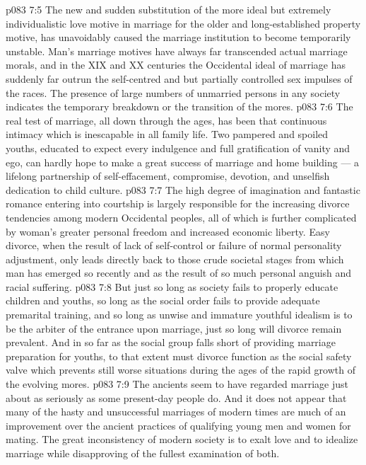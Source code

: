 \vs p083 7:5 The new and sudden substitution of the more ideal but extremely individualistic love motive in marriage for the older and long\hyp{}established property motive, has unavoidably caused the marriage institution to become temporarily unstable. Man’s marriage motives have always far transcended actual marriage morals, and in the XIX and XX centuries the Occidental ideal of marriage has suddenly far outrun the self\hyp{}centred and but partially controlled sex impulses of the races. The presence of large numbers of unmarried persons in any society indicates the temporary breakdown or the transition of the mores.
\vs p083 7:6 The real test of marriage, all down through the ages, has been that continuous intimacy which is inescapable in all family life. Two pampered and spoiled youths, educated to expect every indulgence and full gratification of vanity and ego, can hardly hope to make a great success of marriage and home building --- a lifelong partnership of self\hyp{}effacement, compromise, devotion, and unselfish dedication to child culture.
\vs p083 7:7 The high degree of imagination and fantastic romance entering into courtship is largely responsible for the increasing divorce tendencies among modern Occidental peoples, all of which is further complicated by woman’s greater personal freedom and increased economic liberty. Easy divorce, when the result of lack of self\hyp{}control or failure of normal personality adjustment, only leads directly back to those crude societal stages from which man has emerged so recently and as the result of so much personal anguish and racial suffering.
\vs p083 7:8 But just so long as society fails to properly educate children and youths, so long as the social order fails to provide adequate premarital training, and so long as unwise and immature youthful idealism is to be the arbiter of the entrance upon marriage, just so long will divorce remain prevalent. And in so far as the social group falls short of providing marriage preparation for youths, to that extent must divorce function as the social safety valve which prevents still worse situations during the ages of the rapid growth of the evolving mores.
\vs p083 7:9 \pc The ancients seem to have regarded marriage just about as seriously as some present\hyp{}day people do. And it does not appear that many of the hasty and unsuccessful marriages of modern times are much of an improvement over the ancient practices of qualifying young men and women for mating. The great inconsistency of modern society is to exalt love and to idealize marriage while disapproving of the fullest examination of both.
